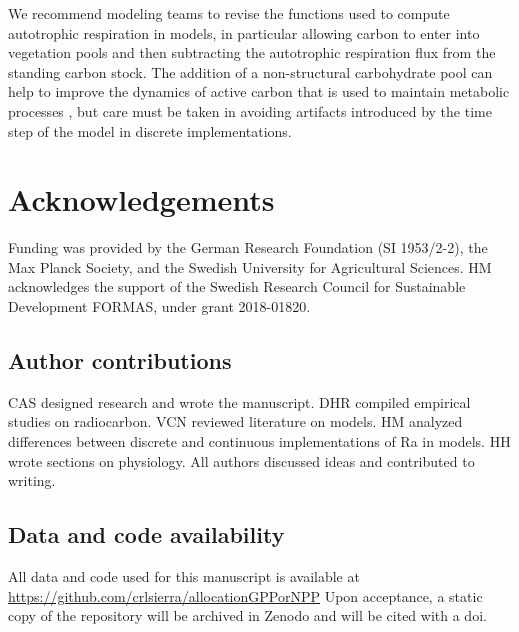 \documentclass[12pt, a4paper]{article}
\begin{document}
We recommend modeling teams to revise the functions used to compute autotrophic respiration in models, in particular allowing carbon to enter into vegetation pools and then subtracting the autotrophic respiration flux from the standing carbon stock. The addition of a non-structural carbohydrate pool can help to improve the dynamics of active carbon that is used to maintain metabolic processes \citep{Herrera2020}, but care must be taken in avoiding artifacts introduced by the time step of the model in discrete implementations. 


\section*{Acknowledgements}
Funding was provided by the German Research Foundation (SI 1953/2-2), the Max Planck Society, and the Swedish University for Agricultural Sciences. HM acknowledges the support of the Swedish Research Council for Sustainable Development FORMAS, under grant 2018-01820.

\subsection*{Author contributions}
CAS designed research and wrote the manuscript. DHR compiled empirical studies on radiocarbon. VCN reviewed literature on models. HM analyzed differences between discrete and continuous implementations of Ra in models. HH wrote sections on physiology. All authors discussed ideas and contributed to writing.

\subsection*{Data and code availability}
All data and code used for this manuscript is available at \url{https://github.com/crlsierra/allocationGPPorNPP}
Upon acceptance, a static copy of the repository will be archived in Zenodo and will be cited with a doi. 



\end{document}
